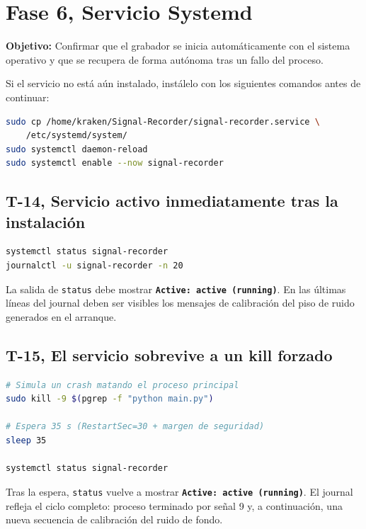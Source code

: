 \section{Fase 6, Servicio Systemd}

\textbf{Objetivo:} Confirmar que el grabador se inicia automáticamente con el sistema operativo y que se recupera de forma autónoma tras un fallo del proceso.

Si el servicio no está aún instalado, instálelo con los siguientes comandos antes de continuar:

\begin{lstlisting}[language=bash]
sudo cp /home/kraken/Signal-Recorder/signal-recorder.service \
    /etc/systemd/system/
sudo systemctl daemon-reload
sudo systemctl enable --now signal-recorder
\end{lstlisting}

\subsection{T-14, Servicio activo inmediatamente tras la instalación}

\begin{lstlisting}[language=bash]
systemctl status signal-recorder
journalctl -u signal-recorder -n 20
\end{lstlisting}

\begin{tcolorbox}[colback=gray!5, colframe=deyposcolor, title=Resultado esperado (T-14)]
La salida de \texttt{status} debe mostrar \texttt{\textbf{Active: active (running)}}. En las últimas líneas del journal deben ser visibles los mensajes de calibración del piso de ruido generados en el arranque.
\end{tcolorbox}

\subsection{T-15, El servicio sobrevive a un kill forzado}

\begin{lstlisting}[language=bash]
# Simula un crash matando el proceso principal
sudo kill -9 $(pgrep -f "python main.py")

# Espera 35 s (RestartSec=30 + margen de seguridad)
sleep 35

systemctl status signal-recorder
\end{lstlisting}

\begin{tcolorbox}[colback=gray!5, colframe=deyposcolor, title=Resultado esperado (T-15)]
Tras la espera, \texttt{status} vuelve a mostrar \texttt{\textbf{Active: active (running)}}. El journal refleja el ciclo completo: proceso terminado por señal 9 y, a continuación, una nueva secuencia de calibración del ruido de fondo.
\end{tcolorbox}

